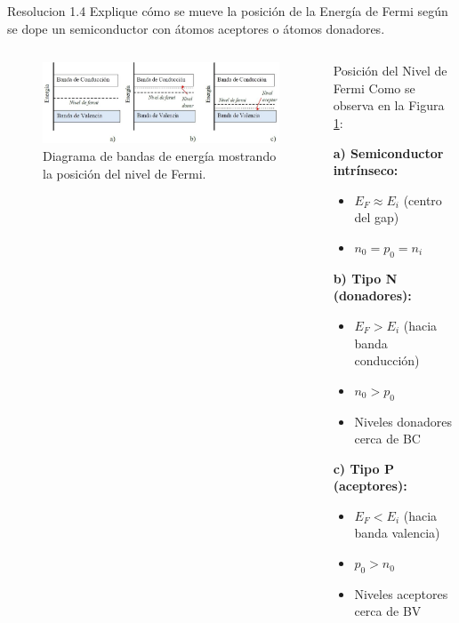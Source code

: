 \documentclass[
    10pt,
    aspectratio=169,
    xcolor={dvipsnames},
    spanish,
    ]{beamer}
\begin{document}
\begin{frame}
  \begin{block}{Resolucion 1.4}
   Explique cómo se mueve la posición de la Energía de Fermi según se dope un semiconductor con átomos aceptores o átomos donadores.
  \end{block}
  
  \begin{columns}
    \begin{column}{0.5\textwidth}
      \begin{figure}
        \centering
        \includegraphics[width=\textwidth]{../figures/Auxiliar_2_5}
        \caption{Diagrama de bandas de energía mostrando la posición del nivel de Fermi.}
        \label{fig:fermi}
      \end{figure}
    \end{column}
    
    \begin{column}{0.48\textwidth}
      \begin{block}{Posición del Nivel de Fermi}
        \scriptsize
        Como se observa en la Figura \ref{fig:fermi}:
        
        \vspace{0.2cm}
        \textbf{a) Semiconductor intrínseco:}
        \begin{itemize}
          \item $E_F \approx E_i$ (centro del gap)
          \item $n_0 = p_0 = n_i$
        \end{itemize}
        
        \vspace{0.2cm}
        \textbf{b) Tipo N (donadores):}
        \begin{itemize}
          \item $E_F > E_i$ (hacia banda conducción)
          \item $n_0 > p_0$
          \item Niveles donadores cerca de BC
        \end{itemize}
        
        \vspace{0.2cm}
        \textbf{c) Tipo P (aceptores):}
        \begin{itemize}
          \item $E_F < E_i$ (hacia banda valencia)
          \item $p_0 > n_0$
          \item Niveles aceptores cerca de BV
        \end{itemize}
      \end{block}
    \end{column}
  \end{columns}
\end{frame}
\end{document}
